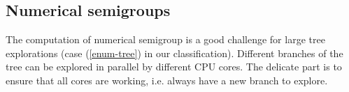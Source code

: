 \documentclass{deliverablereport}
\newcommand{\CilkP}{\texttt{Cilk++}\xspace}
\begin{document}




\subsection{Numerical semigroups}
\label{subsec:numerical-semigroups}

The computation of numerical semigroup is a good challenge for large tree
explorations (case (\ref{enum-tree}) in our
classification). Different branches of the
tree can be explored in parallel by different CPU cores. The
delicate part is to ensure that all cores are working,
i.e. always have a new branch to explore.
\end{document}
